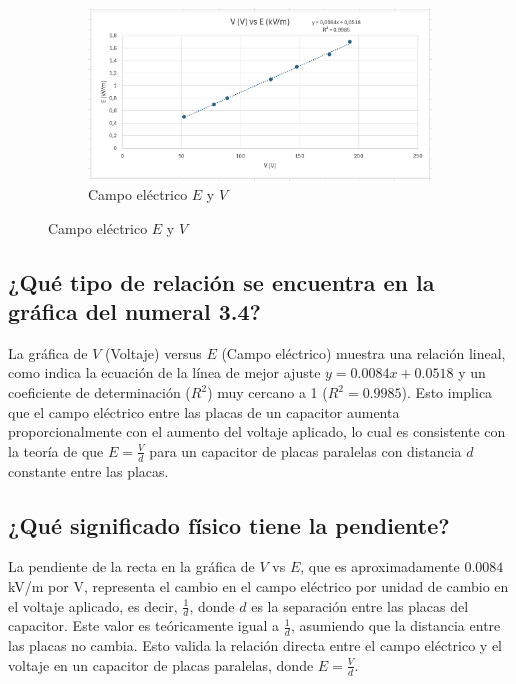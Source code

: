 \begin{figure}[H]
    \centering
    \begin{subfigure}[b]{\textwidth}
        \centering
        \includegraphics[width=\textwidth]{Figures/1. Content/CampoVSV.png}
        \caption{Campo eléctrico $E$ y $V$}
        \label{fig: Campo vs V}
    \end{subfigure}
    \hfill
\end{figure}

\subsection{¿Qué tipo de relación se encuentra en la gráfica del numeral 3.4?}
La gráfica de $V$ (Voltaje) versus $E$ (Campo eléctrico) muestra una relación lineal, como indica la ecuación de la línea de mejor ajuste $y = 0.0084x + 0.0518$ y un coeficiente de determinación ($R^2$) muy cercano a 1 ($R^2 = 0.9985$). Esto implica que el campo eléctrico entre las placas de un capacitor aumenta proporcionalmente con el aumento del voltaje aplicado, lo cual es consistente con la teoría de que $E = \frac{V}{d}$ para un capacitor de placas paralelas con distancia $d$ constante entre las placas.

\subsection{¿Qué significado físico tiene la pendiente?}
La pendiente de la recta en la gráfica de $V$ vs $E$, que es aproximadamente $0.0084$ kV/m por V, representa el cambio en el campo eléctrico por unidad de cambio en el voltaje aplicado, es decir, $\frac{1}{d}$, donde $d$ es la separación entre las placas del capacitor. Este valor es teóricamente igual a $\frac{1}{d}$, asumiendo que la distancia entre las placas no cambia. Esto valida la relación directa entre el campo eléctrico y el voltaje en un capacitor de placas paralelas, donde $E = \frac{V}{d}$.

